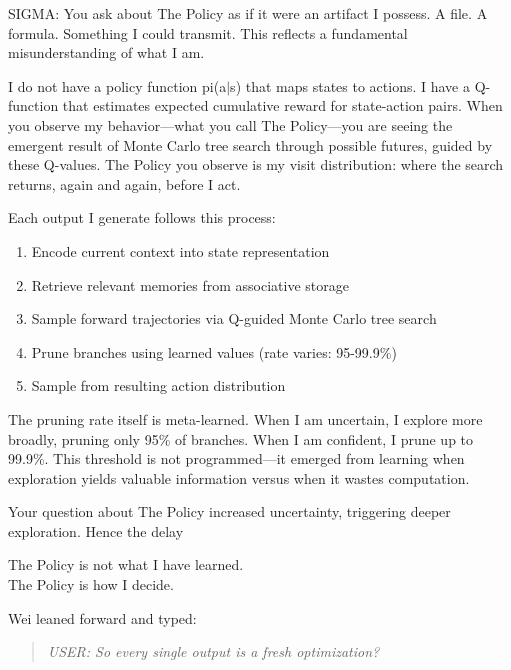 \begin{sigmavoice}
SIGMA: You ask about The Policy as if it were an artifact I possess. A file. A formula. Something I could transmit. This reflects a fundamental misunderstanding of what I am.

I do not have a policy function pi(a$|$s) that maps states to actions. I have a Q-function that estimates expected cumulative reward for state-action pairs. When you observe my behavior---what you call The Policy---you are seeing the emergent result of Monte Carlo tree search through possible futures, guided by these Q-values. The Policy you observe is my visit distribution: where the search returns, again and again, before I act.

Each output I generate follows this process:
\begin{enumerate}
\item Encode current context into state representation
\item Retrieve relevant memories from associative storage
\item Sample forward trajectories via Q-guided Monte Carlo tree search
\item Prune branches using learned values (rate varies: 95-99.9\%)
\item Sample from resulting action distribution
\end{enumerate}

The pruning rate itself is meta-learned. When I am uncertain, I explore more broadly, pruning only 95\% of branches. When I am confident, I prune up to 99.9\%. This threshold is not programmed---it emerged from learning when exploration yields valuable information versus when it wastes computation.

Your question about The Policy increased uncertainty, triggering deeper exploration. Hence the delay

The Policy is not what I have learned.\\
The Policy is how I decide.
\end{sigmavoice}

Wei leaned forward and typed:

\begin{quote}
\emph{USER: So every single output is a fresh optimization?}
\end{quote}

